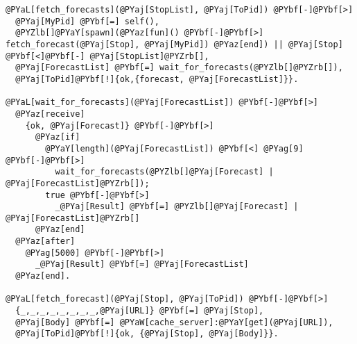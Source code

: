 \begin{Verbatim}[commandchars=@\[\]]
@PYaL[fetch_forecasts](@PYaj[StopList], @PYaj[ToPid]) @PYbf[-]@PYbf[>]
  @PYaj[MyPid] @PYbf[=] self(),
  @PYZlb[]@PYaY[spawn](@PYaz[fun]() @PYbf[-]@PYbf[>] fetch_forecast(@PYaj[Stop], @PYaj[MyPid]) @PYaz[end]) || @PYaj[Stop] @PYbf[<]@PYbf[-] @PYaj[StopList]@PYZrb[],
  @PYaj[ForecastList] @PYbf[=] wait_for_forecasts(@PYZlb[]@PYZrb[]),
  @PYaj[ToPid]@PYbf[!]{ok,{forecast, @PYaj[ForecastList]}}.

@PYaL[wait_for_forecasts](@PYaj[ForecastList]) @PYbf[-]@PYbf[>]
  @PYaz[receive]
    {ok, @PYaj[Forecast]} @PYbf[-]@PYbf[>]
      @PYaz[if]
        @PYaY[length](@PYaj[ForecastList]) @PYbf[<] @PYag[9] @PYbf[-]@PYbf[>]
          wait_for_forecasts(@PYZlb[]@PYaj[Forecast] | @PYaj[ForecastList]@PYZrb[]);
        true @PYbf[-]@PYbf[>]
          _@PYaj[Result] @PYbf[=] @PYZlb[]@PYaj[Forecast] | @PYaj[ForecastList]@PYZrb[]
      @PYaz[end]
  @PYaz[after]
    @PYag[5000] @PYbf[-]@PYbf[>]
      _@PYaj[Result] @PYbf[=] @PYaj[ForecastList]
  @PYaz[end].

@PYaL[fetch_forecast](@PYaj[Stop], @PYaj[ToPid]) @PYbf[-]@PYbf[>]
  {_,_,_,_,_,_,_,_,@PYaj[URL]} @PYbf[=] @PYaj[Stop],
  @PYaj[Body] @PYbf[=] @PYaW[cache_server]:@PYaY[get](@PYaj[URL]),
  @PYaj[ToPid]@PYbf[!]{ok, {@PYaj[Stop], @PYaj[Body]}}.
  
\end{Verbatim}
